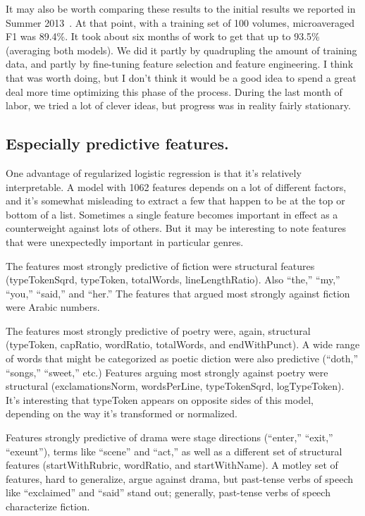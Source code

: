 \documentclass[paper=a4, fontsize=12pt]{scrartcl}
\numberwithin{equation}{section}		%
\numberwithin{figure}{section}			%
\numberwithin{table}{section}				%
\begin{document}
It may also be worth comparing these results to the initial results we reported in Summer 2013~\cite{underwood:mutable}. At that point, with a training set of 100 volumes, microaveraged F1 was 89.4\%. It took about six months of work to get that up to 93.5\% (averaging both models). We did it partly by quadrupling the amount of training data, and partly by fine-tuning feature selection and feature engineering. I think that was worth doing, but I don't think it would be a good idea to spend a great deal more time optimizing this phase of the process. During the last month of labor, we tried a lot of clever ideas, but progress was in reality fairly stationary.

\subsection{Especially predictive features.}

One advantage of regularized logistic regression is that it's relatively interpretable. A model with 1062 features depends on a lot of different factors, and it's somewhat misleading to extract a few that happen to be at the top or bottom of a list. Sometimes a single feature becomes important in effect as a counterweight against lots of others. But it may be interesting to note features that were unexpectedly important in particular genres.

The features most strongly predictive of fiction were structural features (typeTokenSqrd, typeToken, totalWords, lineLengthRatio). Also ``the,'' ``my,'' ``you,'' ``said,'' and ``her.'' The features that argued most strongly against fiction were Arabic numbers.

The features most strongly predictive of poetry were, again, structural (typeToken, capRatio, wordRatio, totalWords, and endWithPunct). A wide range of words that might be categorized as poetic diction were also predictive (``doth,'' ``songs,'' ``sweet,'' etc.) Features arguing most strongly against poetry were structural (exclamationsNorm, wordsPerLine, typeTokenSqrd, logTypeToken). It's interesting that typeToken appears on opposite sides of this model, depending on the way it's transformed or normalized.

Features strongly predictive of drama were stage directions (``enter,'' ``exit,'' ``exeunt''), terms like ``scene'' and ``act,'' as well as a different set of structural features (startWithRubric, wordRatio, and startWithName). A motley set of features, hard to generalize, argue against drama, but past-tense verbs of speech like ``exclaimed'' and ``said'' stand out; generally, past-tense verbs of speech characterize fiction.
\end{document}
